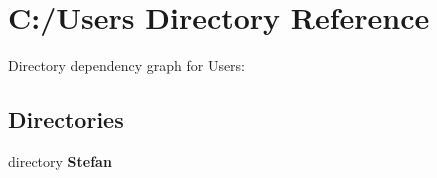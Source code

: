 \section{C\+:/\+Users Directory Reference}
\label{dir_8ceffd4ee35c3518d4e8bdc7e638efe8}
Directory dependency graph for Users\+:
\subsection*{Directories}
\begin{DoxyCompactItemize}
\item 
directory {\bf Stefan}
\end{DoxyCompactItemize}

